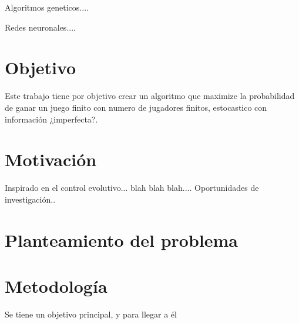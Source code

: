Algoritmos geneticos.... 

Redes neuronales.... 



\section{Objetivo}

Este trabajo tiene por objetivo crear un algoritmo que maximize la probabilidad de ganar un juego %
finito con numero de jugadores finitos, estocastico con información ¿imperfecta?.
 
\section{Motivación}

Inspirado en el control evolutivo... blah blah blah.... Oportunidades de investigación..

\section{Planteamiento del problema}

\blindtext
\section{Metodología} 

Se tiene un objetivo principal, y para llegar a \'el %


\blindtext

